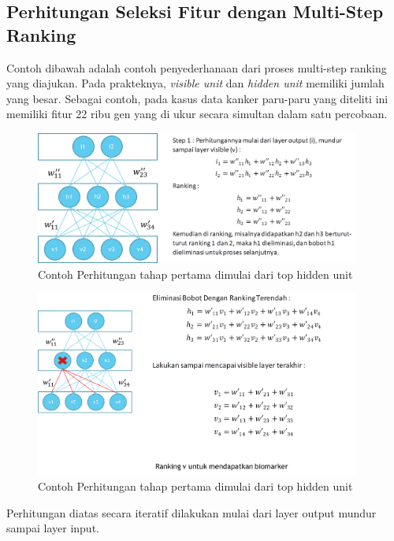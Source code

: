 \subsection{Perhitungan Seleksi Fitur dengan Multi-Step Ranking }

Contoh dibawah adalah contoh penyederhanaan dari proses multi-step ranking yang diajukan. Pada prakteknya, \textit{visible unit} dan \textit{hidden unit} memiliki jumlah yang besar. Sebagai contoh, pada kasus data kanker paru-paru yang diteliti ini memiliki fitur 22 ribu gen yang di ukur secara simultan dalam satu percobaan.

\begin{figure}
	\centering
	\includegraphics[width=0.95\textwidth]
		{pics/multistep2.png}
	\caption{Contoh Perhitungan tahap pertama dimulai dari top hidden unit }
	\label{fig:multistep2}
\end{figure}

\begin{figure}
	\centering
	\includegraphics[width=0.95\textwidth]
		{pics/multistep3.png}
	\caption{Contoh Perhitungan tahap pertama dimulai dari top hidden unit }
	\label{fig:multistep3}
\end{figure}

Perhitungan diatas secara iteratif dilakukan mulai dari layer output mundur sampai layer input.


